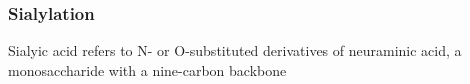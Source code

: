 \subsubsection {Sialylation}
Sialyic acid refers to N- or O-substituted derivatives of neuraminic acid, a monosaccharide with a nine-carbon backbone